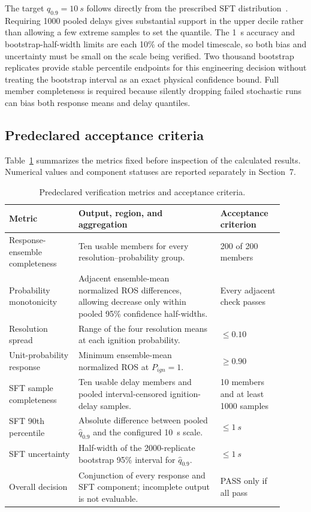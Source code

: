 The target \(q_{0.9}=\SI{10}{s}\) follows directly from the prescribed SFT
distribution~\cite{Qin2025}.  Requiring 1000 pooled delays gives substantial
support in the upper decile rather than allowing a few extreme samples to set
the quantile.  The \SI{1}{s} accuracy and bootstrap-half-width limits are each
10\% of the model timescale, so both bias and uncertainty must be small on the
scale being verified.  Two thousand bootstrap replicates provide stable
percentile endpoints for this engineering decision without treating the
bootstrap interval as an exact physical confidence bound.  Full member
completeness is required because silently dropping failed stochastic runs can
bias both response means and delay quantiles.

\subsection{Predeclared acceptance criteria}

Table~\ref{tab:acceptance-contract} summarizes the metrics fixed before
inspection of the calculated results. Numerical values and component statuses
are reported separately in Section~7.

\begin{table}[H]
\centering
\footnotesize
\caption{Predeclared verification metrics and acceptance criteria.}
\label{tab:acceptance-contract}
\begin{tabular}{@{}p{0.23\linewidth}p{0.47\linewidth}p{0.21\linewidth}@{}}
\toprule
Metric & Output, region, and aggregation & Acceptance criterion\\
\midrule
Response-ensemble completeness & Ten usable members for every resolution--probability group. & 200 of 200 members \\
Probability monotonicity & Adjacent ensemble-mean normalized ROS differences, allowing decrease only within pooled 95\% confidence half-widths. & Every adjacent check passes \\
Resolution spread & Range of the four resolution means at each ignition probability. & \(\le0.10\) \\
Unit-probability response & Minimum ensemble-mean normalized ROS at \(P_{ign}=1\). & \(\ge0.90\) \\
SFT sample completeness & Ten usable delay members and pooled interval-censored ignition-delay samples. & 10 members and at least 1000 samples \\
SFT 90th percentile & Absolute difference between pooled \(\widehat q_{0.9}\) and the configured \SI{10}{s} scale. & \(\le\SI{1}{s}\) \\
SFT uncertainty & Half-width of the 2000-replicate bootstrap 95\% interval for \(\widehat q_{0.9}\). & \(\le\SI{1}{s}\) \\
Overall decision & Conjunction of every response and SFT component; incomplete output is not evaluable. & PASS only if all pass \\
\bottomrule
\end{tabular}
\end{table}

